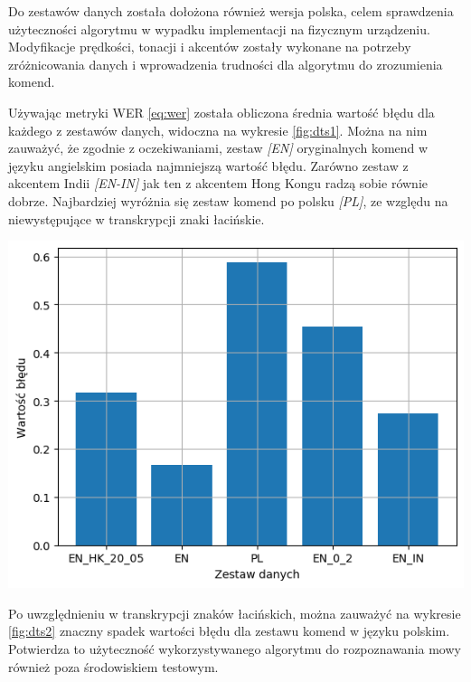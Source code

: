 Do zestawów danych została dołożona również wersja polska, celem sprawdzenia użyteczności algorytmu w wypadku implementacji na fizycznym urządzeniu. Modyfikacje prędkości, tonacji i akcentów zostały wykonane na potrzeby zróżnicowania danych i wprowadzenia trudności dla algorytmu do zrozumienia komend. 

Używając metryki WER \ref{eq:wer} została obliczona średnia wartość błędu dla każdego z zestawów danych, widoczna na wykresie \ref{fig:dts1}. Można na nim zauważyć, że zgodnie z oczekiwaniami, zestaw \textit{[EN]} oryginalnych komend w języku angielskim posiada najmniejszą wartość błędu. Zarówno zestaw z akcentem Indii \textit{[EN-IN]} jak ten z akcentem Hong Kongu radzą sobie równie dobrze. Najbardziej wyróżnia się zestaw komend po polsku \textit{[PL]}, ze względu na niewystępujące w transkrypcji znaki łacińskie.

\begin{center}
    \includegraphics[width=0.95\linewidth]{files/output1.png}
    \label{fig:dts1}
\end{center}

Po uwzględnieniu w transkrypcji znaków łacińskich, można zauważyć na wykresie \ref{fig:dts2} znaczny spadek wartości błędu dla zestawu komend w języku polskim. Potwierdza to użyteczność wykorzystywanego algorytmu do rozpoznawania mowy również poza środowiskiem testowym.

